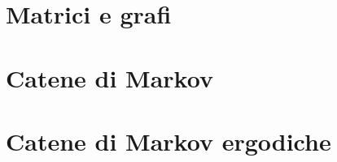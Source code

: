 \providecommand{\main}{.}






{\hypersetup{hidelinks}
  \tableofcontents  %
}




\chapter{Matrici e grafi}

\clearpage


\clearpage






\chapter{Catene di Markov}

\clearpage

\clearpage












\clearpage


\chapter{Catene di Markov ergodiche}






